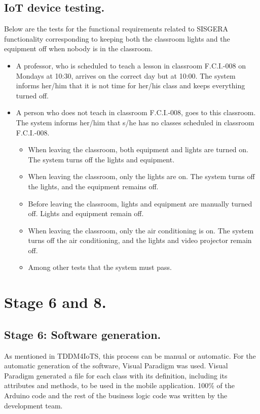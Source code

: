 \documentclass[]{scrartcl}
\begin{document}
	\subsection*{IoT device testing.}
	Below are the tests for the functional requirements related to SISGERA functionality corresponding to keeping both the classroom lights and the equipment off when nobody is in the classroom.
	\begin{itemize}
		\item A professor, who is scheduled to teach a lesson in classroom F.C.I.-008 on Mondays at 10:30, arrives on the correct day but at 10:00. The system informs her/him that it is not time for her/his class and keeps everything turned off.
		\item A person who does not teach in classroom F.C.I.-008, goes to this classroom. The system informs her/him that s/he has no classes scheduled in classroom F.C.I.-008.
		\begin{itemize}
			\item When leaving the classroom, both equipment and lights are turned on. The system turns off the lights and equipment.
			\item When leaving the classroom, only the lights are on. The system turns off the lights, and the equipment remains off.
			\item Before leaving the classroom, lights and equipment are manually turned off. Lights and equipment remain off.
			\item When leaving the classroom, only the air conditioning is on. The system turns off the air conditioning, and the lights and video projector remain off.
			\item Among other tests that the system must pass.
		\end{itemize}
	\end{itemize}
\section*{Stage 6 and 8.}
	\subsection*{Stage 6: Software generation.}
	As mentioned in TDDM4IoTS, this process can be manual or automatic. For the automatic generation of the software, Visual Paradigm was used. Visual Paradigm generated a file for each class with its definition, including its attributes and methods, to be used in the mobile application. 100\% of the Arduino code and the rest of the business logic code was written by the development team.\\
\end{document}
